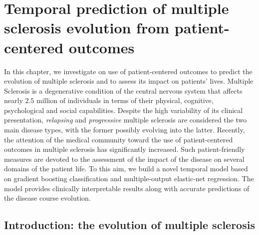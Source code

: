 
\chapter{Temporal prediction of multiple sclerosis evolution from patient-centered outcomes} \label{chap:aism}

\begin{displayquote}
	In this chapter, we investigate on
	use of patient-centered outcomes to predict the evolution of multiple sclerosis and to assess its impact on patients' lives.
	Multiple Sclerosis is a degenerative condition of the central nervous system that affects nearly $2.5$ million of individuals in terms of their physical, cognitive, psychological and social capabilities. Despite the high variability of its clinical presentation, \textit{relapsing} and \textit{progressive} multiple sclerosis are considered the two main disease types, with the former possibly evolving into the latter.
	Recently, the attention of the medical community toward the use of patient-centered outcomes in multiple sclerosis has significantly increased. Such patient-friendly measures are devoted to the assessment of the impact of the disease on several domains of the patient life.
	To this aim, we build a novel temporal model based on gradient boosting classification and multiple-output elastic-net regression. The model
	provides clinically interpretable results along with accurate predictions of the disease course evolution.
\end{displayquote}

\section{Introduction: the evolution of multiple sclerosis} \label{sec:aism_intro}

